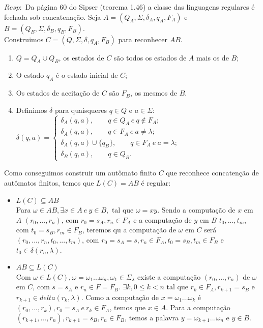 \documentclass{homework}
\begin{document}

	$Resp:$ Da página 60 do Sipser (teorema 1.46) a classe das linguagens regulares é fechada sob concatenação.
	Seja $A =(Q_A,\Sigma,\delta_A,q_A,F_A)$ e $B = (Q_B,\Sigma,\delta_B,q_B,F_B)$.\\
	Construimos $C = (Q,\Sigma,\delta,q_A,F_B)$ para reconhecer $AB$.
	\begin{enumerate}
		\item $Q = Q_A \cup Q_B$, os estados de $C$ são todos os estados de $A$ mais os de $B$;
		\item O estado $q_A$ é o estado inicial de $C$;
		\item Os estados de aceitação de $C$ são $F_B$, os mesmos de $B$. 
		\item Definimos $\delta$ para quaisqueres $q \in Q$ e $a \in \Sigma$:\\
		$\delta(q,a) = \begin{cases}
							\delta_A(q,a),\qquad q \in Q_A \ e \ q \notin F_A;\\
							\delta_A(q,a),\qquad q \in F_A \ e \ a \neq \lambda;\\
							\delta_A(q,a) \cup \{q_B\},\qquad q \in F_A \ e \ a = \lambda;\\
							\delta_B(q,a), \qquad  q \in Q_B.
					   \end{cases}					  
		$
	\end{enumerate}
	Como conseguimos construir um autômato finito $C$ que reconhece concatenção de autômatos finitos, temos que $L(C) = AB$ é regular:
	\begin{itemize}
		\item $L(C) \subseteq AB$\\
			Para $\omega \in AB, \exists x \in A\ e\ y \in B,$ tal que $\omega=xy$. Sendo a computação de $x$ em $A$ $(r_0,...,r_n)$, com $r_0=s_A,r_n \in F_A$ e a computação de $y$ em $B$ $t_0,...,t_m$, com $t_0=s_B,r_m \in F_B$, teremos qu a computação de $\omega$ em $C$ será $(r_0,...,r_n,t_0,...,t_m)$, com $r_0=s_A=s,r_n \in F_A, t_0=s_B,t_m \in F_B$ e $t_0 \in \delta(r_n,\lambda)$.
		\item $AB \subseteq L(C)$\\
			Com $\omega \in L(C), \omega=\omega_1...\omega_n, \omega_1 \in \Sigma_\lambda$ existe a computação $(r_0,...,r_n)$ de $\omega$ em $C$, com $s=s_A$ e $r_n \in F=F_B$. $\exists k, 0 \leq k < n$ tal que $r_k \in F_A,r_{k+1}=s_B$ e $r_{k+1} \in delta(r_k, \lambda)$. Como a computação de $x=\omega_1...\omega_k$ é $(r_0,...,r_k), r_0=s_A\ e\ r_k \in F_A$, temos que $x \in A$. Para a computação $(r_{k+1},...,r_n),r_{k+1}=s_B,r_n \in F_B$, temos a palavra $y=\omega_{k+1}...\omega_n$ e $y \in B$.
	\end{itemize}
\end{document}

